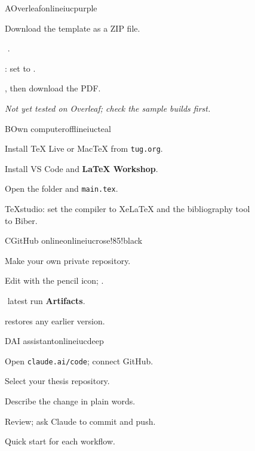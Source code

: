 \documentclass[11pt,a4paper]{article}
\newcommand\then{\,\textrightarrow\,}
\begin{document}
\begin{figure}[H]
\begin{tcbraster}[raster columns=2,raster equal height=rows,raster column skip=8pt,
  raster row skip=8pt]
\begin{pathcard}{A\enspace Overleaf}{online}{iucpurple}
\begin{steps}
  \item Download the template as a ZIP file.
  \item {}\then{}.
  \item {}: set  to .
  \item {}, then download the PDF.
\end{steps}
\textit{Not yet tested on Overleaf; check the sample builds first.}
\end{pathcard}
\begin{pathcard}{B\enspace Own computer}{offline}{iucteal}
\begin{steps}
  \item Install TeX Live or MacTeX from \texttt{tug.org}.
  \item Install VS Code and \textbf{LaTeX Workshop}.
  \item Open the folder and  \texttt{main.tex}.
\end{steps}
TeXstudio: set the compiler to XeLaTeX and the bibliography tool to Biber.
\end{pathcard}
\begin{pathcard}{C\enspace GitHub online}{online}{iucrose!85!black}
\begin{steps}
  \item Make your own private repository.
  \item Edit with the pencil icon; .
  \item {}\then latest run\then\textbf{Artifacts}.
  \item {} restores any earlier version.
\end{steps}
\end{pathcard}
\begin{pathcard}{D\enspace AI assistant}{online}{iucdeep}
\begin{steps}
  \item Open \texttt{claude.ai/code}; connect GitHub.
  \item Select your thesis repository.
  \item Describe the change in plain words.
  \item Review; ask Claude to commit and push.
\end{steps}
\end{pathcard}
\end{tcbraster}
\caption{Quick start for each workflow.}
\label{fig:quick}
\end{figure}
\end{document}
